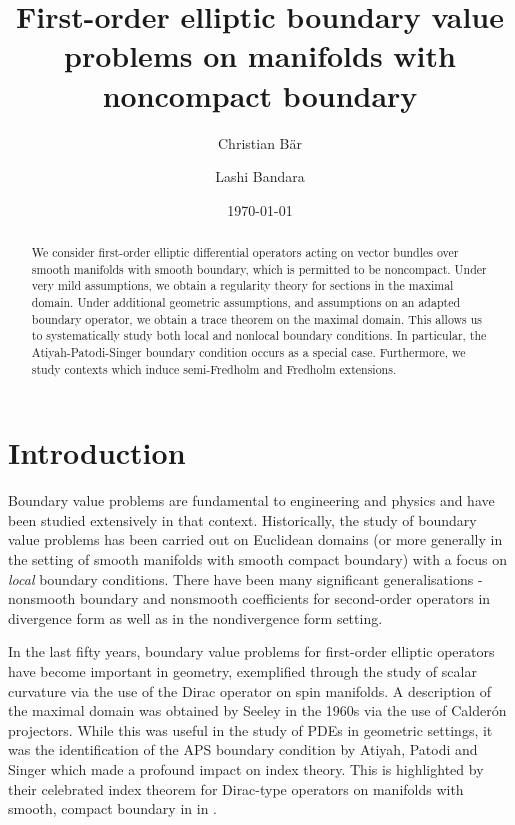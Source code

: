 \documentclass[a4paper,10pt,reqno]{amsart}
\author{Christian Bär}
\author{Lashi Bandara}
\title[First-order elliptic noncompact boundary value problems]
{First-order elliptic boundary value problems on manifolds with noncompact boundary}
\date{\today}
\theoremstyle{definition}
\begin{document}
\begin{abstract}
We consider first-order elliptic differential operators acting on vector bundles over smooth manifolds with smooth boundary, which is permitted to be noncompact.
Under very mild assumptions, we obtain a regularity theory for sections in the maximal domain.
Under additional geometric assumptions, and assumptions on an adapted boundary operator, we obtain a trace theorem on the maximal domain.
This allows us to systematically study both local and nonlocal boundary conditions.
In particular, the Atiyah-Patodi-Singer boundary condition occurs as a special case.
Furthermore, we study contexts which induce semi-Fredholm and Fredholm extensions.
\end{abstract}
\maketitle

\tableofcontents

\parindent0cm
\setlength{\parskip}{\baselineskip}


\section{Introduction}

Boundary value problems are fundamental to engineering and physics and have been studied extensively in that context.
Historically, the study of boundary value problems has been carried out on Euclidean domains (or more generally in the setting of smooth manifolds with smooth compact boundary) with a focus on \emph{local} boundary conditions.
There have been many significant generalisations - nonsmooth boundary and nonsmooth coefficients for second-order operators in divergence form as well as in the nondivergence form setting.

In the last fifty years, boundary value problems for first-order elliptic operators have become important in geometry, exemplified through the study of scalar curvature via the use of the Dirac operator on spin manifolds.
A description of the maximal domain was obtained by Seeley \cite{Seeley} in the 1960s via the use of Calderón projectors.
While this was useful in the study of PDEs in geometric settings, it was the identification of the APS boundary condition by Atiyah, Patodi and Singer which made a profound impact on index theory.
This is highlighted by their celebrated index theorem  for Dirac-type operators on manifolds with smooth, compact boundary in in \cites{APS-Ann,APS1, APS2, APS3}.
\end{document}
